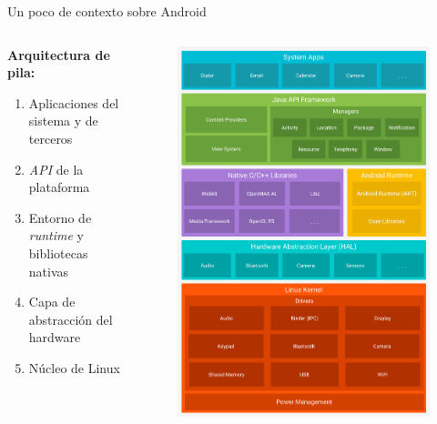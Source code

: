 \documentclass[pdf]{beamer} %
\begin{document}
\begin{frame}{Un poco de contexto sobre Android}
    \begin{columns}
        \begin{column}{.6\textwidth}
            \textbf{Arquitectura de pila:} \pause
            \begin{enumerate}[<+->]
                \item Aplicaciones del sistema y de terceros
                \item \textit{API} de la plataforma
                \item Entorno de \textit{runtime} y bibliotecas nativas
                \item Capa de abstracción del hardware
                \item Núcleo de Linux
            \end{enumerate}
        \end{column}

        \begin{column}{.4\textwidth}
            \begin{figure}
                \includegraphics[scale=0.1]{../imagenes/android-stack.png}
            \end{figure}
        \end{column}
    \end{columns}


\end{frame}
\end{document}
